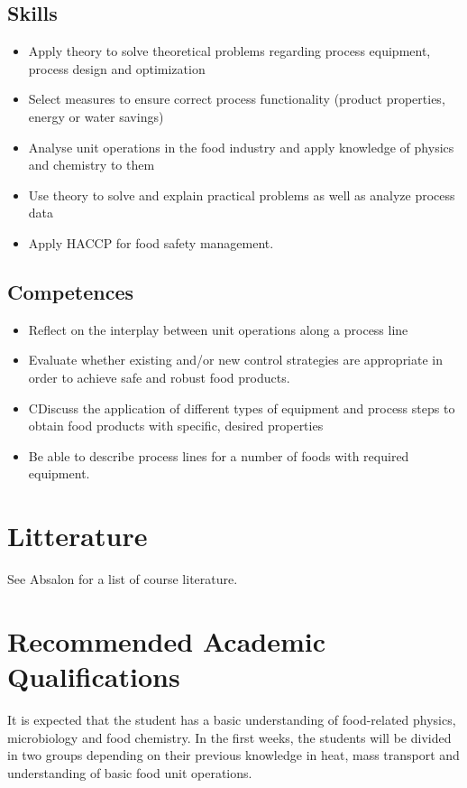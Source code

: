 \subsection{Skills}
\begin{highlight}
    \begin{itemize}
        \item Apply theory to solve theoretical problems regarding process equipment, process design and optimization
        \item Select measures to ensure correct process functionality (product properties, energy or water savings)
        \item Analyse unit operations in the food industry and apply knowledge of physics and chemistry to them
        \item Use theory to solve and explain practical problems as well as analyze process data
        \item Apply HACCP for food safety management.
\end{itemize}
\end{highlight} 

\subsection{Competences}  
\begin{highlight}
    \begin{itemize}
        \item Reflect on the interplay between unit operations along a process line
        \item Evaluate whether existing and/or new control strategies are appropriate in order to achieve safe and robust food products.
        \item CDiscuss the application of different types of equipment and process steps to obtain food products with specific, desired properties
        \item Be able to describe process lines for a number of foods with required equipment.
    \end{itemize}
\end{highlight}

\section{Litterature}
See Absalon for a list of course literature.

\section{Recommended Academic Qualifications}
It is expected that the student has a basic understanding of food-related physics, microbiology and food chemistry. In the first weeks, the students will be divided in two groups depending on their previous knowledge in heat, mass transport and understanding of basic food unit operations.

